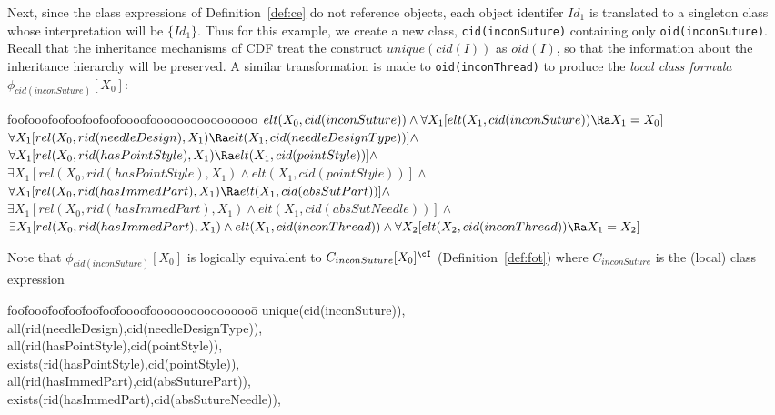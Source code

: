 \begin{example}
Next, since the class expressions of Definition~\ref{def:ce} do not
reference objects, each object identifer $Id_1$ is translated to a
singleton class whose interpretation will be $\{Id_1\}$.  Thus for
this example, we create a new class, {\tt cid(inconSuture)} containing
only {\tt oid(inconSuture)}.  Recall that the inheritance mechanisms
of CDF treat the construct $unique(cid(I))$ as $oid(I)$, so that the
information about the inheritance hierarchy will be preserved.  A
similar transformation is made to {\tt oid(inconThread)} to produce
the {\em local class formula} $\phi_{cid(inconSuture)}[X_0]$:
{\small
\begin{tabbing}
foo\=fooo\=foo\=foo\=foo\=foo\=foooo\=foooooooooooooooo\=\kill
\> $elt(X_0,cid(inconSuture)) \wedge 
	\forall X_1 [elt(X_1,cid(inconSuture)) \Ra X_1 = X_0]$ \\
\> $\forall X_1 [rel(X_0,rid(needleDesign),X_1)
	\Ra elt(X_1,cid(needleDesignType))] \wedge$ \\
\> $\forall X_1 [rel(X_0,rid(hasPointStyle),X_1) 
	\Ra elt(X_1,cid(pointStyle))] \wedge$ \\
\> $\exists X_1 [rel(X_0,rid(hasPointStyle),X_1) 
	\wedge elt(X_1,cid(pointStyle))] \wedge$ \\
\> $\forall X_1 [rel(X_0,rid(hasImmedPart),X_1) 
	\Ra elt(X_1,cid(absSutPart))] \wedge$ \\
\> $\exists X_1 [rel(X_0,rid(hasImmedPart),X_1) 
	\wedge elt(X_1,cid(absSutNeedle))] \wedge$ \\
\> $\exists X_1 [rel(X_0,rid(hasImmedPart),X_1) 
	\wedge elt(X_1,cid(inconThread)) \wedge 
		\forall X_2 [elt(X_2,cid(inconThread)) \Ra X_1 = X_2]$  
\end{tabbing}
}
\noindent
Note that $\phi_{cid(inconSuture)}[X_0]$ is logically equivalent to
$C_{inconSuture}[X_0]^{\cI}$ (Definition~\ref{def:fot}) where
$C_{inconSuture}$ is the (local) class expression
{\it {\small
\begin{tabbing}
foo\=fooo\=foo\=foo\=foo\=foo\=foooo\=foooooooooooooooo\=\kill
\> unique(cid(inconSuture)),  \\
\> all(rid(needleDesign),cid(needleDesignType)), \\
\> all(rid(hasPointStyle),cid(pointStyle)), \\
\> exists(rid(hasPointStyle),cid(pointStyle)), \\
\> all(rid(hasImmedPart),cid(absSuturePart)), \\
\> exists(rid(hasImmedPart),cid(absSutureNeedle)), \\

\end{tabbing}}}
\end{example}
